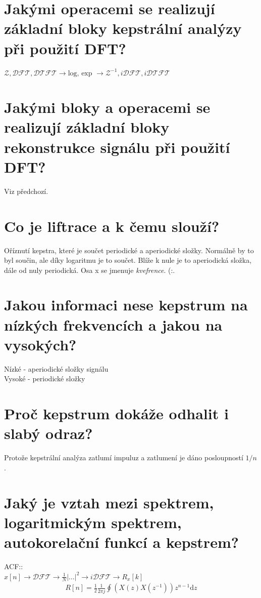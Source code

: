 \documentclass[a4paper,12pt]{article}   %
\newcommand{\mt}[1]{$#1$}
\newcommand{\dd}{\text{d}}
\begin{document}
\section{Jakými operacemi se realizují základní bloky kepstrální analýzy při použití DFT?}

\mt{\mathscr{Z}, \mathscr{DFT}, \mathscr{DTFT} \rightarrow \text{log, exp }\rightarrow \mathscr{Z}^{-1}, i\mathscr{DFT}, i\mathscr{DTFT}}


\section{Jakými bloky a operacemi se realizují základní bloky rekonstrukce signálu při použití DFT?}

Viz předchozí.


\section{Co je liftrace a k čemu slouží?}

Oříznutí kepstra, které je součet periodické a aperiodické složky. Normálně by to byl součin, ale díky logaritmu je to součet. Blíže k nule je to aperiodická složka, dále od nuly periodická. Osa x se jmenuje \textit{kvefrence}. (:.


\section{Jakou informaci nese kepstrum na nízkých frekvencích a jakou na vysokých?}

Nízké - aperiodické složky signálu\\
Vysoké - periodické složky


\section{Proč kepstrum dokáže odhalit i slabý odraz?}

Protože kepstrální analýza zatlumí impuluz a zatlumení je dáno posloupností \mt{1/n}.


\section{Jaký je vztah mezi spektrem, logaritmickým spektrem, autokorelační funkcí a kepstrem?}

ACF::\\
\mt{x[n] \rightarrow \mathscr{DFT} \rightarrow \frac{1}{N}|\dots|^2 \rightarrow i\mathscr{DFT} \rightarrow R_x[k]}
\begin{align*}
        R[n] = \frac{1}{2}\frac{1}{2\pi j}\oint (X(z)X(z^{-1}))z^{n-1}\dd z
\end{align*}
\end{document}
